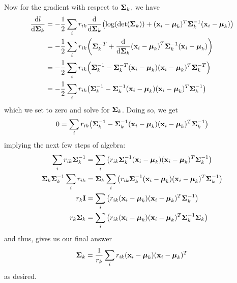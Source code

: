 \documentclass[12pt,letterpaper,fleqn]{hmcpset}
\begin{document}
\begin{solution}
Now for the gradient with respect to $\Sigmab_k$, we have
\begin{align*}
\dv{l}{\Sigmab_k} &= -\frac12 \sum_i r_{ik} \dv{\Sigmab_k}\qty(\log(\det (\Sigmab_k) )+  (\vb x_i - \mub_k)^T \Sigmab^{-1}_k (\vb x_i - \mub_k)) \\
 &= -\frac12 \sum_i r_{ik} \qty(\Sigmab^{-T}_k + \dv{\Sigmab_k} (\vb x_i - \mub_k)^T \Sigmab^{-1}_k (\vb x_i - \mub_k)) \\
 &= -\frac12 \sum_i r_{ik} \qty(\Sigmab^{-1}_k -  \Sigmab^{-T}_k (\vb x_i - \mub_k) (\vb x_i - \mub_k)^T \Sigmab^{-T}_k ) \\
 &= -\frac12 \sum_i r_{ik} \qty(\Sigmab^{-1}_k -  \Sigmab^{-1}_k (\vb x_i - \mub_k) (\vb x_i - \mub_k)^T \Sigmab^{-1}_k )
\end{align*}
which we set to zero and solve for $\Sigmab_k$. Doing so, we get
\begin{align*}
0 = \sum_i r_{ik} \qty(\Sigmab^{-1}_k -  \Sigmab^{-1}_k (\vb x_i - \mub_k) (\vb x_i - \mub_k)^T \Sigmab^{-1}_k ) 
\end{align*}
implying the next few steps of algebra:
\begin{align*}
\sum_i r_{ik} \Sigmab^{-1}_k &= \sum_i  \qty(r_{ik} \Sigmab^{-1}_k (\vb x_i - \mub_k) (\vb x_i - \mub_k)^T \Sigmab^{-1}_k ) \\
\Sigmab_k \Sigmab^{-1}_k \sum_i r_{ik}  &= \Sigmab_k\sum_i  \qty(r_{ik} \Sigmab^{-1}_k (\vb x_i - \mub_k) (\vb x_i - \mub_k)^T \Sigmab^{-1}_k ) \\
r_k \vb I   &= \sum_i  \qty(r_{ik} (\vb x_i - \mub_k) (\vb x_i - \mub_k)^T \Sigmab^{-1}_k )\\
r_k \Sigmab_k   &= \sum_i  \qty(r_{ik} (\vb x_i - \mub_k) (\vb x_i - \mub_k)^T \Sigmab^{-1}_k \Sigmab_k)
\end{align*}
and thus, gives us our final answer
\begin{align*}
\Sigmab_k = \frac{1}{r_{k}} \sum_i r_{ik}(\vb x_i - \mub_k) (\vb x_i - \mub_k)^T 
\end{align*}
as desired.







\end{solution}
\newpage
\end{document}
